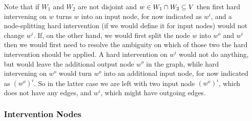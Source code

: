 \begin{claimmark}
\begin{Rem}
    Note that if $W_1$ and $W_2$ are not disjoint and $w \in W_1 \cap W_2 \subseteq V$
    then first hard intervening on $w$ turns $w$ into an input node, for now indicated as $w^i$, and a node-splitting hard intervention (if we would define it for input nodes) would not change $w^i$.
    If, on the other hand, we would first split the node $w$ into $w^o$ and $w^i$ then we would first need to resolve the ambiguity on which of those two the hard intervention should be applied. A hard intervention on $w^i$ would not do anything, but would leave the additional output node $w^o$ in the graph, while hard intervening on $w^o$ would turn $w^o$ into an additional input node, for now indicated as $(w^o)^i$. So in the latter case we are left with two input node $(w^o)^i$, which does not have any edges, and $w^i$, which might have outgoing edges.
\end{Rem}
\end{claimmark}

\subsubsection{Intervention Nodes}

